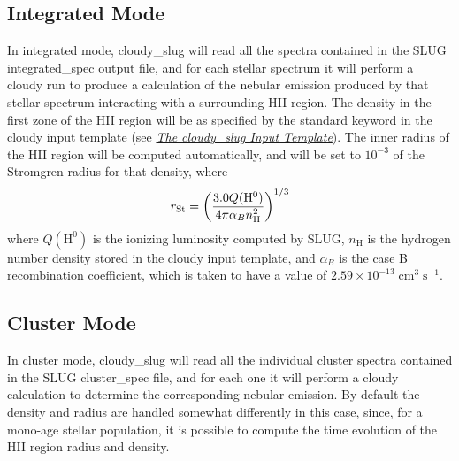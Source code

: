 \documentclass[letterpaper,10pt,english]{sphinxmanual}
\begin{document}
\subsection{Integrated Mode}
\label{cloudy:sssec-cloudy-integrated-mode}\label{cloudy:integrated-mode}
In integrated mode, cloudy\_slug will read all the spectra contained in
the SLUG integrated\_spec output file, and for each stellar spectrum it
will perform a cloudy run to produce a calculation of the nebular
emission produced by that stellar spectrum interacting with a
surrounding HII region. The density in the first zone of the HII
region will be as specified by the standard  keyword in the
cloudy input template (see {\hyperref[cloudy:ssec-cloudy-template]{\emph{The cloudy\_slug Input Template}}}). The inner
radius of the HII region will be computed automatically, and will be
set to \(10^{-3}\) of the Stromgren radius for that density, where
\begin{gather}
\begin{split}r_{\mathrm{St}} = \left(\frac{3.0 Q(\mathrm{H}^0)}{4\pi
\alpha_B n_{\mathrm{H}}^2}\right)^{1/3}\end{split}\notag
\end{gather}
where \(Q(\mathrm{H}^0)\) is the ionizing luminosity computed by
SLUG, \(n_{\mathrm{H}}\) is the hydrogen number density stored in
the cloudy input template, and \(\alpha_B\) is the case B
recombination coefficient, which is taken to have a value of
\(2.59\times 10^{-13}\;\mathrm{cm}^3\;\mathrm{s}^{-1}\).


\subsection{Cluster Mode}
\label{cloudy:cluster-mode}\label{cloudy:sssec-cloudy-cluster-mode}
In cluster mode, cloudy\_slug will read all the individual cluster
spectra contained in the SLUG cluster\_spec file, and for each one it
will perform a cloudy calculation to determine the corresponding
nebular emission. By default the density and radius are handled somewhat
differently in this case, since, for a mono-age stellar population, it
is possible to compute the time evolution of the HII region radius and
density.
\end{document}
